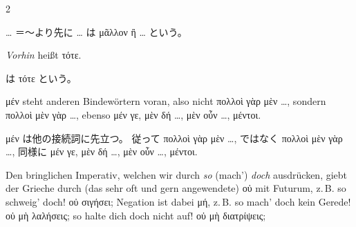 \begin{paracol}{2}
\begin{enumerate}[leftmargin=0pt,rightmargin=0pt,listparindent =1cm,labelindent=1cm,labelsep=1ex,labelwidth={*},itemindent={*},align=left]
\begin{japanese}
 \ldots{} ＝〜より先に \ldots{} は
\textgreek[variant=ancient]{μᾶλλον ἢ }\ldots{} という。
\end{japanese}
\switchcolumn*

\begin{german}
\item \emph{Vorhin} heißt \textgreek[variant=ancient]{τότε.} 
\end{german}
\switchcolumn

\begin{japanese}
 は \textgreek[variant=ancient]{τότε} という。
\end{japanese}
\switchcolumn*

\begin{german}
\item \textgreek[variant=ancient]{μέν} steht anderen Bindewörtern voran,
also nicht \textgreek[variant=ancient]{πολλοὶ γὰρ μὲν }\ldots{}\textgreek[variant=ancient]{,}
sondern \textgreek[variant=ancient]{πολλοὶ μὲν γὰρ }\ldots{}\textgreek[variant=ancient]{,}
ebenso \textgreek[variant=ancient]{μέν γε, μὲν δή }\ldots{}\textgreek[variant=ancient]{,
μὲν οὖν }\ldots{}\textgreek[variant=ancient]{, μέντοι.}
\end{german}
\switchcolumn

\begin{japanese}
\textgreek[variant=ancient]{μέν} は他の接続詞に先立つ。
従って \textgreek[variant=ancient]{πολλοὶ γὰρ μὲν }\ldots{}\textgreek[variant=ancient]{,}
ではなく \textgreek[variant=ancient]{πολλοὶ μὲν γὰρ }\ldots{}\textgreek[variant=ancient]{,}
同様に \textgreek[variant=ancient]{μέν γε, μὲν δή }\ldots{}\textgreek[variant=ancient]{,
μὲν οὖν }\ldots{}\textgreek[variant=ancient]{, μέντοι.}
\end{japanese}
\switchcolumn*

\begin{german}
\item Den bringlichen Imperativ, welchen wir durch \emph{so} (mach') \emph{doch}
ausdrücken, giebt der Grieche durch (das sehr oft und gern angewendete)
\textgreek[variant=ancient]{οὐ} mit Futurum, z.\,B. so schweig' doch!
\textgreek[variant=ancient]{οὐ σιγήσει;} Negation ist dabei \textgreek[variant=ancient]{μή,}
z.\,B. so mach' doch kein Gerede! \textgreek[variant=ancient]{οὐ μὴ
λαλήσεις; }so halte dich doch nicht auf! \textgreek[variant=ancient]{οὐ
μὴ διατρίψεις;}
\end{german}
\switchcolumn


\end{enumerate}
\end{paracol}
